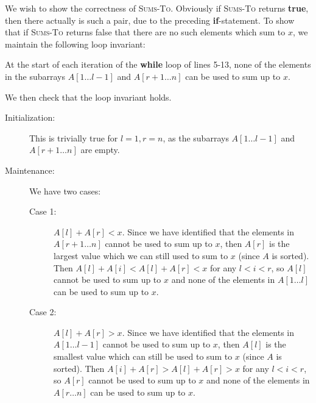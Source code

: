 \documentclass[Chapter02]{subfiles}
\begin{document}
\begin{enumerate}
\begin{answer}
\begin{algorithm}[H]
			\end{algorithm}

			We wish to show the correctness of \textsc{Sums-To}. Obviously if \textsc{Sums-To} returns \textbf{true}, then there actually is such a pair, due to the preceding \textbf{if}-statement. To show that if \textsc{Sums-To} returns false that there are no such elements which sum to $x$, we maintain the following loop invariant:

			\begin{addmargin}[2em]{2em}
				At the start of each iteration of the \textbf{while} loop of lines 5-13, none of the elements in the subarrays $A[1 \dots l - 1]$ and $A[r + 1 \dots n]$ can be used to sum up to $x$.
			\end{addmargin}

			We then check that the loop invariant holds.

			\begin{description}
				\item[Initialization:] This is trivially true for $l = 1, r = n$, as the subarrays $A[1 \dots l - 1]$ and $A[r + 1 \dots n]$ are empty.

				\item[Maintenance:] We have two cases:
				\begin{description}
					\item[Case 1:] $A[l] + A[r] < x$. Since we have identified that the elements in $A[r + 1 \dots n]$ cannot be used to sum up to $x$, then $A[r]$ is the largest value which we can still used to sum to $x$ (since $A$ is sorted). Then $A[l] + A[i] < A[l] + A[r] < x$ for any $l < i < r$, so $A[l]$ cannot be used to sum up to $x$ and none of the elements in $A[1 \dots l]$ can be used to sum up to $x$.

					\item[Case 2:] $A[l] + A[r] > x$. Since we have identified that the elements in $A[1 \dots l - 1]$ cannot be used to sum up to $x$, then $A[l]$ is the smallest value which can still be used to sum to $x$ (since $A$ is sorted). Then $A[i] + A[r] > A[l] + A[r] > x$ for any $l < i < r$, so $A[r]$ cannot be used to sum up to $x$ and none of the elements in $A[r \dots n]$ can be used to sum up to $x$.
				\end{description}


\end{description}
\end{answer}
\end{enumerate}
\end{document}
